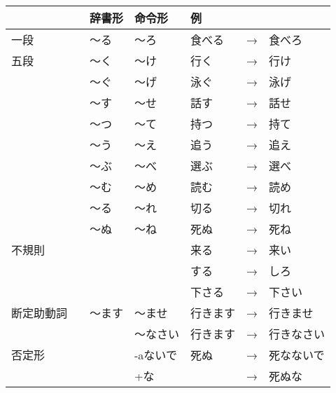 	\newpage		
	\centering
	\begin{tabular}{llllll}
		\toprule[2pt]
		& 辞書形 & 命令形 & 例 & & \\
		\midrule
		一段 & 〜る & 〜ろ & 食べる&→&食べろ\\
		\midrule
		五段 & 〜く & 〜け & 行く&→&行け\\
		& 〜ぐ & 〜げ & 泳ぐ&→&泳げ\\
		& 〜す & 〜せ & 話す&→&話せ\\
		& 〜つ & 〜て & 持つ&→&持て\\
		& 〜う & 〜え & 追う&→&追え\\
		& 〜ぶ & 〜べ & 選ぶ&→&選べ\\
		& 〜む & 〜め & 読む&→&読め\\
		& 〜る & 〜れ & 切る&→&切れ\\
		& 〜ぬ & 〜ね & 死ぬ&→&死ね\\
		\midrule
		不規則	& & & 来る &→& 来い \\
		& & & する &→& しろ \\
		& & & 下さる &→& 下さい \\
		\midrule
		断定助動詞　& 〜ます & 〜ませ & 行きます&→&行きませ \\
		& & 〜なさい & 行きます&→&行きなさい \\
		\midrule
		否定形　& &-aないで &死ぬ &→&死なないで\\
		　& &+な & &→&死ぬな\\
		\bottomrule[2pt]
	\end{tabular}
